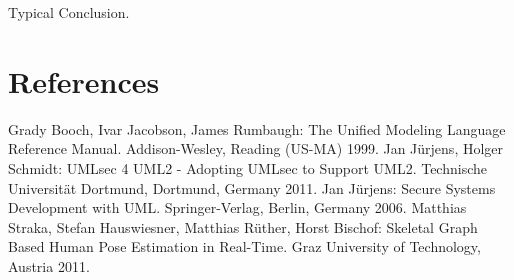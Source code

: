 \documentclass{acmtog} %
\begin{document}
Typical Conclusion.

\section{References}
\renewcommand{\section}[2]{}
\begin{raggedright}%
\begin{thebibliography}{X}
	 Grady Booch, Ivar Jacobson, James Rumbaugh: The Unified Modeling Language Reference Manual. Addison-Wesley, Reading (US-MA) 1999.
	 Jan Jürjens, Holger Schmidt: UMLsec 4 UML2 - Adopting UMLsec to Support UML2. Technische Universität Dortmund, Dortmund, Germany 2011.
	 Jan Jürjens: Secure Systems Development with UML. Springer-Verlag, Berlin, Germany 2006.
	 Matthias Straka, Stefan Hauswiesner, Matthias Rüther, Horst Bischof: Skeletal Graph Based Human Pose Estimation in Real-Time. Graz University of Technology, Austria 2011.
\end{thebibliography}
\end{raggedright}
\end{document}

